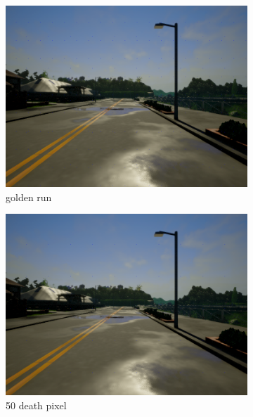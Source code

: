 \documentclass[14pt]{extarticle}
\begin{document}
	\begin{figure}
	     \centering
	     \begin{subfigure}[b]{0.3\textwidth}
	         \centering
	 		 \includegraphics[scale=0.1]{./foto_sporcature/original.png}
	         \caption{golden run}
	         \label{fig:golden run}
	     \end{subfigure}
	     \hfill
	     \begin{subfigure}[b]{0.3\textwidth}
	         \centering
			 \includegraphics[scale=0.1]{./foto_sporcature/50_death_pixels.png}
	         \caption{50 death pixel}
	         \label{fig:50}
	     \end{subfigure}
	     \hfill
	     \begin{subfigure}[b]{0.3\textwidth}

\end{subfigure}
\end{figure}
\end{document}
